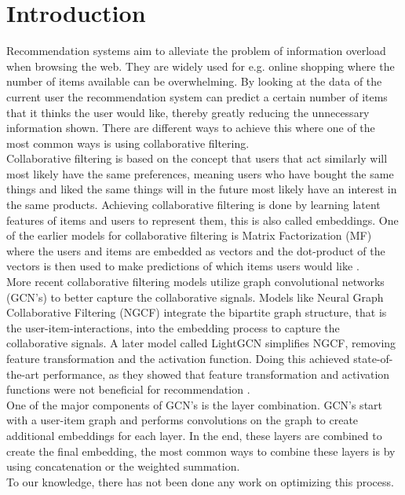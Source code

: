 \section{Introduction}
Recommendation systems aim to alleviate the problem of information overload when browsing the web.
They are widely used for e.g. online shopping where the number of items available can be overwhelming.
By looking at the data of the current user the recommendation system can predict a certain number of items that it thinks the user would like, thereby greatly reducing the unnecessary information shown.
There are different ways to achieve this where one of the most common ways is using collaborative filtering.
\\
Collaborative filtering is based on the concept that users that act similarly will most likely have the same preferences, meaning users who have bought the same things and liked the same things will in the future most likely have an interest in the same products.
Achieving collaborative filtering is done by learning latent features of items and users to represent them, this is also called embeddings.
One of the earlier models for collaborative filtering is Matrix Factorization (MF) where the users and items are embedded as vectors and the dot-product of the vectors is then used to make predictions of which items users would like \cite{Matrix-factorization-techniques}.
\\
More recent collaborative filtering models utilize graph convolutional networks (GCN's) to better capture the collaborative signals.
Models like Neural Graph Collaborative Filtering (NGCF) integrate the bipartite graph structure, that is the user-item-interactions, into the embedding process to capture the collaborative signals\cite{NGCF_2019}.
A later model called LightGCN simplifies NGCF, removing feature transformation and the activation function.
Doing this achieved state-of-the-art performance, as they showed that feature transformation and activation functions were not beneficial for recommendation \cite{lightgcn}.
\\
One of the major components of GCN's is the layer combination.
GCN's start with a user-item graph and performs convolutions on the graph to create additional embeddings for each layer. %
In the end, these layers are combined to create the final embedding, the most common ways to combine these layers is by using concatenation or the weighted summation.
\\
To our knowledge, there has not been done any work on optimizing this process.
